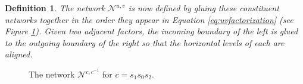 \documentclass[12pt]{amsart}
\newcommand{\sayDR}[1]{\say[DR]{\color{red}{\bf DR:}\;#1}}
\newcommand{\cN}{\mathcal{N}} %
\newtheorem{definition}[theorem]{Definition}
\theoremstyle{remark}
\numberwithin{equation}{section}
\numberwithin{figure}{section}
\begin{document}
\begin{definition}
The network $\cN^{u,v}$ is now defined by gluing these constituent networks together in the order they appear in Equation \ref{eq:uvfactorization} (see Figure \ref{fig:totalnetwork}). Given two adjacent factors, the incoming boundary of the left is glued to the outgoing boundary of the right so that the horizontal levels of each are aligned. 
\end{definition}

\begin{figure}
\centering
{}
\caption{The network $\cN^{c,c^{-1}}$ for $c = s_1 s_0 s_2$.}
\label{fig:totalnetwork}
\end{figure}
\end{document}
